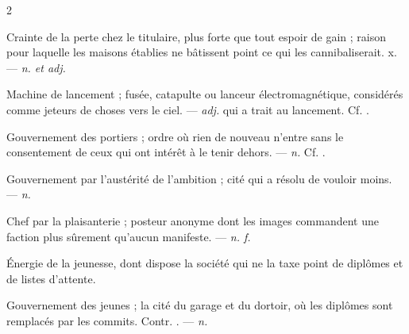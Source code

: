 \begin{multicols}{2}

 Crainte de la perte chez le titulaire, plus forte que tout espoir de gain ; raison pour laquelle les maisons établies ne bâtissent point ce qui les cannibaliserait.   x. —  \textit{n. et adj.}

 Machine de lancement ; fusée, catapulte ou lanceur électromagnétique, considérés comme jeteurs de choses vers le ciel. —  \textit{adj.} qui a trait au lancement. Cf. .

 Gouvernement des portiers ; ordre où rien de nouveau n'entre sans le consentement de ceux qui ont intérêt à le tenir dehors. —  \textit{n.} Cf. .

 Gouvernement par l'austérité de l'ambition ; cité qui a résolu de vouloir moins. —  \textit{n.}

 Chef par la plaisanterie ; posteur anonyme dont les images commandent une faction plus sûrement qu'aucun manifeste.   —  \textit{n. f.}

 Énergie de la jeunesse, dont dispose la société qui ne la taxe point de diplômes et de listes d'attente. 

 Gouvernement des jeunes ; la cité du garage et du dortoir, où les diplômes sont remplacés par les commits. Contr. . —  \textit{n.}

\end{multicols}

